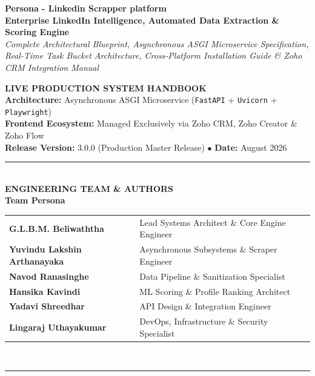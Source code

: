 \documentclass[11pt,a4paper]{report}
\begin{document}
\begin{titlepage}
    \centering
    \vspace*{1.2cm}
    
    {\fontsize{30}{36}\selectfont \textbf{\color{primaryblue}Persona - Linkedin Scrapper platform}}\\[0.6cm]
    {\LARGE \textbf{\color{darknavy}Enterprise LinkedIn Intelligence, Automated Data Extraction \& Scoring Engine}}\\[0.8cm]
    {\large \textit{Complete Architectural Blueprint, Asynchronous ASGI Microservice Specification, Real-Time Task Bucket Architecture, Cross-Platform Installation Guide \& Zoho CRM Integration Manual}}\\[1.5cm]
    
    \begin{tcolorbox}[colback=codebackground,colframe=primaryblue,arc=4mm,width=0.92\textwidth,center]
        \centering
        \textbf{\large LIVE PRODUCTION SYSTEM HANDBOOK}\\[0.2cm]
        \small
        \textbf{Architecture:} Asynchronous ASGI Microservice (\texttt{FastAPI} + \texttt{Uvicorn} + \texttt{Playwright})\\
        \textbf{Frontend Ecosystem:} Managed Exclusively via Zoho CRM, Zoho Creator \& Zoho Flow\\
        \textbf{Release Version:} 3.0.0 (Production Master Release) \quad $\bullet$ \quad \textbf{Date:} August 2026
    \end{tcolorbox}
    
    \vfill
    
    \rule{\textwidth}{1.2pt}\\[0.4cm]
    {\Large \textbf{\color{darknavy}ENGINEERING TEAM \& AUTHORS}}\\[0.3cm]
    \textbf{\Large Team Persona}\\[0.3cm]
    \begin{tabular}{ll}
        \textbf{G.L.B.M. Beliwaththa} & Lead Systems Architect \& Core Engine Engineer \\
        \textbf{Yuvindu Lakshin Arthanayaka} & Asynchronous Subsystems \& Scraper Engineer \\
        \textbf{Navod Ranasinghe} & Data Pipeline \& Sanitization Specialist \\
        \textbf{Hansika Kavindi} & ML Scoring \& Profile Ranking Architect \\
        \textbf{Yadavi Shreedhar} & API Design \& Integration Engineer \\
        \textbf{Lingaraj Uthayakumar} & DevOps, Infrastructure \& Security Specialist \\
    \end{tabular}\\[0.4cm]
    \rule{\textwidth}{1.2pt}
\end{titlepage}
\end{document}
